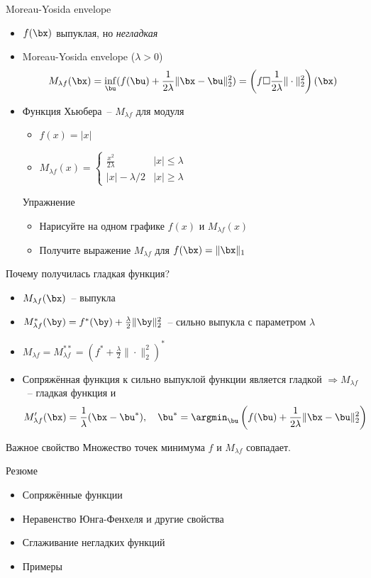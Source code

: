 \documentclass[12pt]{beamer}
\begin{document}
\begin{frame}{Moreau-Yosida envelope}
\begin{itemize}
\item $f(\bx)$ выпуклая, но \emph{негладкая}
\item Moreau-Yosida envelope ($\lambda > 0$)
\[
M_{\lambda f}(\bx) = \inf\limits_{\bu} (f(\bu) + \frac{1}{2\lambda}\|\bx - \bu\|^2_2) = \left(f \square \frac{1}{2\lambda} \|\cdot\|_2^2\right)(\bx)
\]
\item Функция Хьюбера~-- $M_{\lambda f}$ для модуля
\begin{itemize}
\item $f(x) = |x|$
\item $M_{\lambda f}(x) = 
\begin{cases}
\frac{x^2}{2\lambda} & |x| \leq \lambda\\
|x| - \lambda / 2 & |x| \geq \lambda
\end{cases}$
\end{itemize}
\begin{block}{Упражнение}
\begin{itemize}
\item Нарисуйте на одном графике $f(x)$ и $M_{\lambda f}(x)$
\item Получите выражение $M_{\lambda f}$ для $f(\bx) = \|\bx\|_1$ 
\end{itemize}
\end{block}
\end{itemize}

\end{frame}

\begin{frame}{Почему получилась гладкая функция?}
\begin{itemize}
\item $M_{\lambda f}(\bx)$~-- выпукла
\item $M^*_{\lambda f}(\by) = f^*(\by) + \frac{\lambda}{2}\|\by\|_2^2$~-- сильно выпукла с параметром $\lambda$
\item $M_{\lambda f} = M^{**}_{\lambda f} = (f^* + \frac{\lambda}{2}\|\cdot \|_2^2)^*$
\item Сопряжённая функция к сильно выпуклой функции является гладкой $\Rightarrow M_{\lambda f}$~-- гладкая функция и 
\[
M'_{\lambda f}(\bx) = \frac{1}{\lambda} (\bx - \bu^*), \quad \bu^* = \argmin_{\bu} \left(f(\bu) + \frac{1}{2\lambda}\|\bx - \bu\|^2_2\right) 
\]
\end{itemize}

\begin{block}{Важное свойство}
Множество точек минимума $f$ и $M_{\lambda f}$ совпадает.
\end{block}

\end{frame}

\begin{frame}{Резюме}

\begin{itemize}
\item Сопряжённые функции
\item Неравенство Юнга-Фенхеля и другие свойства
\item Сглаживание негладких функций
\item Примеры
\end{itemize}

\end{frame}
\end{document}

